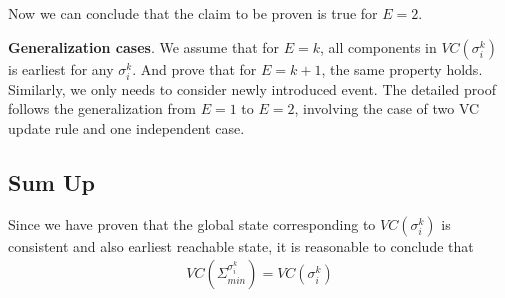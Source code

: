 \documentclass[11pt,a4paper]{article}
\begin{document}
    Now we can conclude that the claim to be proven is true for $E = 2$.

    \textbf{Generalization cases}. We assume that for $E = k$, all components
    in $VC(\sigma_i^k)$ is earliest for any $\sigma_i^k$. And prove that for
    $E = k + 1$, the same property holds. Similarly, we only needs to consider
    newly introduced event. The detailed proof follows the generalization from
    $E = 1$ to $E = 2$, involving the case of two VC update rule and one
    independent case. 

\subsection{Sum Up}
Since we have proven that the global state corresponding to $VC(\sigma_i^k)$
is consistent and also earliest reachable state, it is reasonable to conclude
that 
\begin{align}
 VC (\Sigma_{min}^{\sigma_i^k}) = VC (\sigma_i^k)
\end{align}

\end{document}
